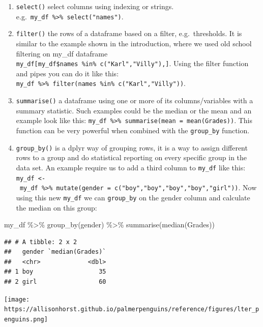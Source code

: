 \documentclass[
]{book}
\newenvironment{Shaded}{\begin{snugshade}}{\end{snugshade}}
\newcommand{\FunctionTok}[1]{\textcolor[rgb]{0.00,0.00,0.00}{#1}}
\newcommand{\NormalTok}[1]{#1}
\newcommand{\SpecialCharTok}[1]{\textcolor[rgb]{0.00,0.00,0.00}{#1}}
\begin{document}
\begin{enumerate}
\def\labelenumi{\arabic{enumi}.}
\item
  \texttt{select()} select columns using indexing or strings.
  e.g.~\texttt{my\_df\ \%\textgreater{}\%\ select("names")}.
\item
  \texttt{filter()} the rows of a dataframe based on a filter,
  e.g.~thresholds. It is similar to the example shown in the
  introduction, where we used old school filtering on my\_df dataframe
  \texttt{my\_df{[}my\_df\$names\ \%in\%\ c("Karl","Villy"),{]}}. Using
  the filter function and pipes you can do it like this:
  \texttt{my\_df\ \%\textgreater{}\%\ filter(names\ \%in\%\ c("Karl","Villy"))}.
\item
  \texttt{summarise()} a dataframe using one or more of its
  columns/variables with a summary statistic. Such examples could be the
  median or the mean and an example look like this:
  \texttt{my\_df\ \%\textgreater{}\%\ summarise(mean\ =\ mean(Grades))}.
  This function can be very powerful when combined with the
  \texttt{group\_by} function.
\item
  \texttt{group\_by()} is a dplyr way of grouping rows, it is a way to
  assign different rows to a group and do statistical reporting on every
  specific group in the data set. An example require us to add a third
  column to \texttt{my\_df} like this:
  \texttt{my\_df\ \textless{}-\ my\_df\ \%\textgreater{}\%\ mutate(gender\ =\ c("boy","boy","boy","boy","girl"))}.
  Now using this new \texttt{my\_df} we can \texttt{group\_by} on the
  gender column and calculate the median on this group:
\end{enumerate}

\begin{Shaded}
\begin{Highlighting}[]
\NormalTok{my\_df }\SpecialCharTok{\%\textgreater{}\%} 
  \FunctionTok{group\_by}\NormalTok{(gender) }\SpecialCharTok{\%\textgreater{}\%} 
  \FunctionTok{summarise}\NormalTok{(}\FunctionTok{median}\NormalTok{(Grades)) }
\end{Highlighting}
\end{Shaded}

\begin{verbatim}
## # A tibble: 2 x 2
##   gender `median(Grades)`
##   <chr>             <dbl>
## 1 boy                  35
## 2 girl                 60
\end{verbatim}

\texttt{[image: https://allisonhorst.github.io/palmerpenguins/reference/figures/lter\_penguins.png]}
\end{document}
